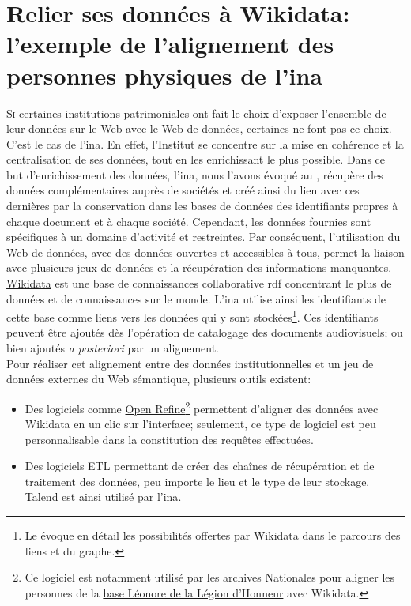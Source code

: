 \chapter{\label{II-C}Relier ses données à Wikidata: l'exemple de l'alignement des personnes physiques de l'\ac{ina}}

\lettrine{S}i certaines institutions patrimoniales ont fait le choix d'exposer l'ensemble de leur données sur le Web avec le Web de données, certaines ne font pas ce choix. C'est le cas de l'\ac{ina}. En effet, l'Institut se concentre sur la mise en cohérence et la centralisation de ses données, tout en les enrichissant le plus possible. Dans ce but d'enrichissement des données, l'\ac{ina}, nous l'avons évoqué au , récupère des données complémentaires auprès de sociétés et créé ainsi du lien avec ces dernières par la conservation dans les bases de données des identifiants propres à chaque document et à chaque société. Cependant, les données fournies sont spécifiques à un domaine d'activité et restreintes. Par conséquent, l'utilisation du Web de données, avec des données ouvertes et accessibles à tous, permet la liaison avec plusieurs jeux de données et la récupération des informations manquantes.\\

\href{https://www.wikidata.org/}{Wikidata} est une base de connaissances collaborative \ac{rdf} concentrant le plus de données et de connaissances sur le monde. L'\ac{ina} utilise ainsi les identifiants de cette base comme liens vers les données qui y sont stockées\footnote{Le  évoque en détail les possibilités offertes par Wikidata dans le parcours des liens et du graphe.}. Ces identifiants peuvent être ajoutés dès l'opération de catalogage des documents audiovisuels; ou bien ajoutés \textit{a posteriori} par un alignement.\\

Pour réaliser cet alignement entre des données institutionnelles et un jeu de données externes du Web sémantique, plusieurs outils existent:
\begin{itemize}
	\item Des logiciels comme \href{https://openrefine.org/}{Open Refine}\footnote{Ce logiciel est notamment utilisé par les archives Nationales pour aligner les personnes de la \href{http://www2.culture.gouv.fr/documentation/leonore/}{base Léonore de la Légion d'Honneur} avec Wikidata.} permettent d'aligner des données avec Wikidata en un clic sur l'interface; seulement, ce type de logiciel est peu personnalisable dans la constitution des requêtes effectuées.
	\item Des logiciels ETL permettant de créer des chaînes de récupération et de traitement des données, peu importe le lieu et le type de leur stockage. \href{https://www.talend.com/fr/}{Talend} est ainsi utilisé par l'\ac{ina}.
\end{itemize}
\medskip

